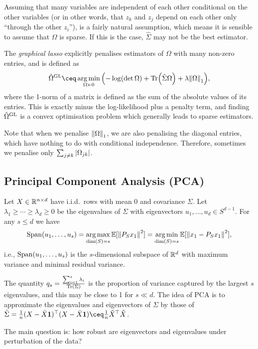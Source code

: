Assuming that many variables are independent of each other conditional on the other variables (or in other words, that $z_k$ and $z_j$ depend on each other only ``through the other $z_i$''), is a fairly natural assumption, which means it is sensible to assume that $\Omega$ is sparse. If this is the case, $\hat\Sigma$ may not be the best estimator. 

The \emph{graphical lasso} explicitly penalises estimators of $\Omega$ with many non-zero entries, and is defined as
\[
\hat\Omega^\Rm{GL} \ceq \argmin_{\Omega \succ 0} \qty(-\log(\det\Omega) + \Tr(\hat\Sigma\Omega) + \lambda \norm{\Omega}_1), 
\]
where the 1-norm of a matrix is defined as the sum of the absolute values of its entries. This is exactly minus the log-likelihood plus a penalty term, and finding $\hat\Omega^\mathrm{GL}$ is a convex optimisation problem which generally leads to sparse estimators. 

Note that when we penalise $\norm{\Omega}_1$, we are also penalising the diagonal entries, which have nothing to do with conditional independence. Therefore, sometimes we penalise only $\sum_{j \neq k} \abs{\Omega_{jk}}$. 

\subsection{Principal Component Analysis (PCA)}
Let $X \in \mathbb R^{n\times d}$ have i.i.d.\ rows with mean 0 and covariance $\Sigma$. Let $\lambda_1 \geq \dotsb \geq \lambda_d \geq 0$ be the eigenvalues of $\Sigma$ with eigenvectors $u_1, \dotsc, u_ d\in S^{d-1}$. For any $s \leq d$ we have
\[
\operatorname{Span}(u_1, \dotsc, u_s) = \operatorname*{arg\,max}_{\dim(S) = s} \mathbb E[ \norm{P_S x_1}^2] = \operatorname*{arg\,min}_{\dim(S) = s} \mathbb E[\norm{x_1 - P_S x_1}^2], 
\]
i.e., $\operatorname{Span}(u_1, \dotsc, u_s)$ is the $s$-dimensional subspace of $\mathbb R^d$ with maximum variance and minimal residual variance. 

The quantity $q_s = \frac{\sum_{i=1}^s \lambda_i}{\Tr(\Sigma)}$ is the proportion of variance captured by the largest $s$ eigenvalues, and this may be close to 1 for $s \ll d$. The idea of PCA is to approximate the eigenvalues and eigenvectors of $\Sigma$ by those of $\hat\Sigma = \frac1n (X - \bar X \mathbf{1})\T (X - \bar X \mathbf{1}) \ceq \frac1n \tilde X\T \tilde X$. 

The main question is: how robust are eigenvectors and eigenvalues under perturbation of the data? 

